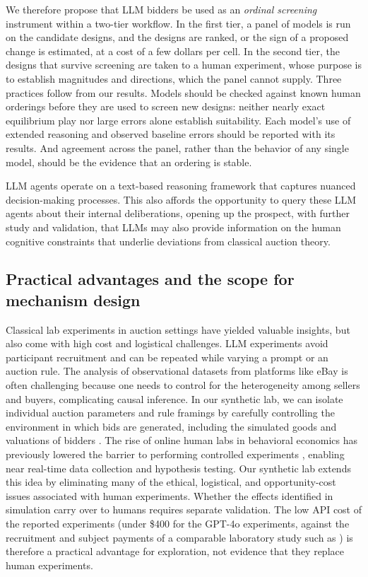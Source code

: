 \documentclass[acmsmall,screen,review]{acmart}
\newcommand{\rev}[1]{{\color{blue}#1}}
\newcommand{\rev}[1]{#1}
\begin{document}
We therefore propose that LLM bidders be used as an \emph{ordinal screening} instrument within a two-tier workflow. In the first tier, a panel of models is run on the candidate designs, and the designs are ranked, or the sign of a proposed change is estimated, at a cost of a few dollars per cell. In the second tier, the designs that survive screening are taken to a human experiment, whose purpose is to establish magnitudes and directions, which the panel cannot supply. Three practices follow from our results. Models should be checked against known human orderings before they are used to screen new designs: neither nearly exact equilibrium play nor large errors alone establish suitability. Each model's use of extended reasoning and observed baseline errors should be reported with its results. And agreement across the panel, rather than the behavior of any single model, should be the evidence that an ordering is stable.

LLM agents operate on a text-based reasoning framework that captures nuanced decision-making processes. This also affords the opportunity to query these LLM agents about their internal deliberations, opening up the prospect, with further study and validation, that LLMs may also provide information on the human cognitive constraints that underlie deviations from classical auction theory.

\subsection{\texorpdfstring{Practical advantages and the scope for mechanism design}{Practical advantages and the scope for mechanism design}}

Classical lab experiments in auction settings have yielded valuable insights, but also come with high cost and logistical challenges. LLM experiments avoid participant recruitment and can be repeated while varying a prompt or an auction rule. The analysis of observational datasets from platforms like eBay is often challenging because one needs to control for the heterogeneity among sellers and buyers, complicating causal inference. In our synthetic lab, we can isolate individual auction parameters and rule framings by carefully controlling the environment in which bids are generated, including the simulated goods and valuations of bidders \citep{manning2024automated}. The rise of online human labs \citep{horton2011online} in behavioral economics has previously lowered the barrier to performing controlled experiments \citep{oprea2024decisions, enke2024behavioral}, enabling near real-time data collection and hypothesis testing. Our synthetic lab extends this idea by eliminating many of the ethical, logistical, and opportunity-cost issues associated with human experiments. Whether the effects identified in simulation carry over to humans requires separate validation. The low API cost of the reported experiments (under \$400 for the GPT-4o experiments, \rev{against the recruitment and subject payments of a comparable laboratory study such as \citealp{li2017obviously}}) is therefore a practical advantage for exploration, not evidence that they replace human experiments.
\end{document}
